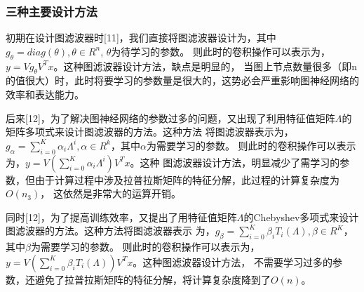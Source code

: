 \subsubsection{三种主要设计方法}
初期在设计图滤波器时[11]，我们直接将图滤波器设计为，其中$ g_{\theta} = diag(\theta),\theta \in R^n $, $ \theta $为待学习的参数。
则此时的卷积操作可以表示为，$ y = V g_{\theta} V^{T} x $。这种图滤波器设计方法，缺点是明显的，
当图上节点数量很多（即n的值很大）时，此时将要学习的参数量是很大的，这势必会严重影响图神经网络的效率和表达能力。

后来[12]，为了解决图神经网络的参数过多的问题，又出现了利用特征值矩阵$ \Lambda $的矩阵多项式来设计图滤波器的方法。这种方法
将图滤波器表示为，$ g_{\alpha} = {\sum_{i=0}^{K}} \alpha_{i} \Lambda^{i},  \alpha \in R^k $，其中$ \alpha $为需要学习的参数。
则此时的卷积操作可以表示为，$ y = V ({\sum_{i=0}^{K}} \alpha_{i} \Lambda^{i}) V^{T} x $。这种
图滤波器设计方法，明显减少了需学习的参数，但由于计算过程中涉及拉普拉斯矩阵的特征分解，此过程的计算复杂度为$ O(n_{3}) $，
这依然是非常大的运算开销。

同时[12]，为了提高训练效率，又提出了用特征值矩阵$ \Lambda $的Chebyshev多项式来设计图滤波器的方法。这种方法将图滤波器表示
为，$ g_{\beta} = {\sum_{i=0}^{K}} \beta_{i} T_{i}(\Lambda),  \beta \in R^K $，其中$ \beta $为需要学习的参数。
则此时的卷积操作可以表示为，$ y = V ({\sum_{i=0}^{K}} \beta_{i} T_{i}(\Lambda)) V^{T} x $。这种图滤波器设计方法，
不需要学习过多的参数，还避免了拉普拉斯矩阵的特征分解，将计算复杂度降到了$ O(n) $。

